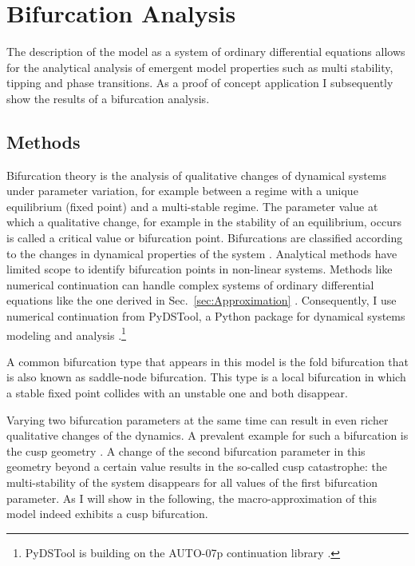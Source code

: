 \section{Bifurcation Analysis}
\label{sec:bifurcation-analysis}

The description of the model as a system of ordinary differential equations allows for the analytical analysis of emergent model properties such as multi stability, tipping and phase transitions. 
As a proof of concept application I subsequently show the results of a bifurcation analysis.

\subsection{Methods}
Bifurcation theory is the analysis of qualitative changes of dynamical systems under parameter variation, for example between a regime with a unique equilibrium (fixed point) and a multi-stable regime.
The parameter value at which a qualitative change, for example in the stability of an equilibrium, occurs is called a critical value or bifurcation point. Bifurcations are classified according to the changes in dynamical properties of the system \cite{Strogatz1994,Kuznetsov1998}.
Analytical methods have limited scope to identify bifurcation points in non-linear systems. Methods like numerical continuation can handle complex systems of ordinary differential equations like the one derived in Sec.~\ref{sec:Approximation} \citep{Allgower2003}.
Consequently, I use numerical continuation from PyDSTool, a Python package for dynamical systems modeling and analysis \citep{pydstool,10.1371/journal.pcbi.1002628}.\footnote{PyDSTool is building on the AUTO-07p continuation library \citep{Doedel07auto-07p:continuation}.}

A common bifurcation type that appears in this model is the fold bifurcation that is also known as saddle-node bifurcation. This type is a local bifurcation in which a stable fixed point collides with an unstable one and both disappear. 

Varying two bifurcation parameters at the same time can result in even richer qualitative changes of the dynamics. A prevalent example for such a bifurcation is the cusp geometry \citep[][p.\.397]{Kuznetsov1998}. A change of the second bifurcation parameter in this geometry beyond a certain value results in the so-called cusp catastrophe: the multi-stability of the system disappears for all values of the first bifurcation parameter. As I will show in the following, the macro-approximation of this model indeed exhibits a cusp bifurcation. 

